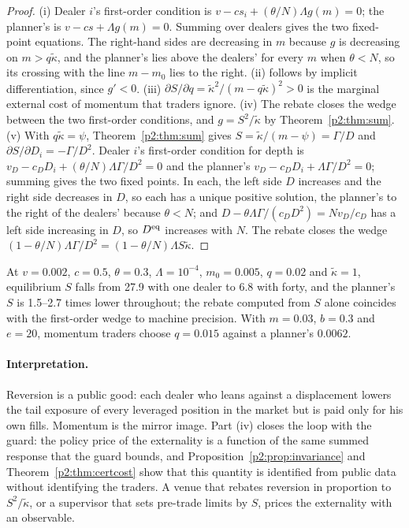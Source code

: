 \begin{proof}
(i) Dealer $i$'s first-order condition is $v-cs_i+(\theta/N)\Lambda g(m)=0$; the planner's is $v-cs+\Lambda g(m)=0$. Summing over dealers gives the two fixed-point equations. The right-hand sides are decreasing in $m$ because $g$ is decreasing on $m>q\tilde\kappa$, and the planner's lies above the dealers' for every $m$ when $\theta<N$, so its crossing with the line $m-m_0$ lies to the right. (ii) follows by implicit differentiation, since $g'<0$. (iii) $\partial S/\partial q=\tilde\kappa^2/(m-q\tilde\kappa)^2>0$ is the marginal external cost of momentum that traders ignore. (iv) The rebate closes the wedge between the two first-order conditions, and $g=S^2/\tilde\kappa$ by Theorem~\ref{p2:thm:sum}. (v) With $q\tilde\kappa=\psi$, Theorem~\ref{p2:thm:sum} gives $S=\tilde\kappa/(m-\psi)=\Gamma/D$ and $\partial S/\partial D_i=-\Gamma/D^2$. Dealer $i$'s first-order condition for depth is $v_D-c_DD_i+(\theta/N)\Lambda\Gamma/D^2=0$ and the planner's $v_D-c_DD_i+\Lambda\Gamma/D^2=0$; summing gives the two fixed points. In each, the left side $D$ increases and the right side decreases in $D$, so each has a unique positive solution, the planner's to the right of the dealers' because $\theta<N$; and $D-\theta\Lambda\Gamma/(c_DD^2)=Nv_D/c_D$ has a left side increasing in $D$, so $D^{\rm eq}$ increases with $N$. The rebate closes the wedge $(1-\theta/N)\Lambda\Gamma/D^2=(1-\theta/N)\Lambda S\tilde\kappa$.
\end{proof}

At $v=0.002$, $c=0.5$, $\theta=0.3$, $\Lambda=10^{-4}$, $m_0=0.005$, $q=0.02$ and $\tilde\kappa=1$, equilibrium $S$ falls from 27.9 with one dealer to 6.8 with forty, and the planner's $S$ is 1.5--2.7 times lower throughout; the rebate computed from $S$ alone coincides with the first-order wedge to machine precision. With $m=0.03$, $b=0.3$ and $e=20$, momentum traders choose $q=0.015$ against a planner's $0.0062$.

\paragraph{Interpretation.} Reversion is a public good: each dealer who leans against a displacement lowers the tail exposure of every leveraged position in the market but is paid only for his own fills. Momentum is the mirror image. Part (iv) closes the loop with the guard: the policy price of the externality is a function of the same summed response that the guard bounds, and Proposition~\ref{p2:prop:invariance} and Theorem~\ref{p2:thm:certcost} show that this quantity is identified from public data without identifying the traders. A venue that rebates reversion in proportion to $S^2/\tilde\kappa$, or a supervisor that sets pre-trade limits by $S$, prices the externality with an observable.

